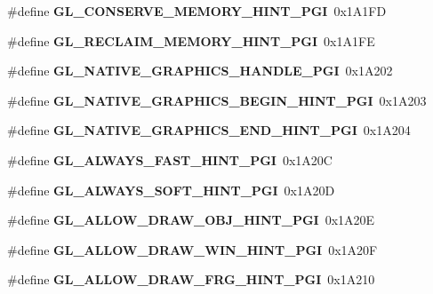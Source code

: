 \begin{DoxyCompactItemize}
\item 
\#define {\bfseries G\+L\+\_\+\+C\+O\+N\+S\+E\+R\+V\+E\+\_\+\+M\+E\+M\+O\+R\+Y\+\_\+\+H\+I\+N\+T\+\_\+\+P\+G\+I}~0x1\+A1\+F\+D\label{_s_d_l__opengl_8h_a41e0ff3de2eb01884561615993b553fa}

\item 
\#define {\bfseries G\+L\+\_\+\+R\+E\+C\+L\+A\+I\+M\+\_\+\+M\+E\+M\+O\+R\+Y\+\_\+\+H\+I\+N\+T\+\_\+\+P\+G\+I}~0x1\+A1\+F\+E\label{_s_d_l__opengl_8h_a379004101af841ae7562fb41897efebf}

\item 
\#define {\bfseries G\+L\+\_\+\+N\+A\+T\+I\+V\+E\+\_\+\+G\+R\+A\+P\+H\+I\+C\+S\+\_\+\+H\+A\+N\+D\+L\+E\+\_\+\+P\+G\+I}~0x1\+A202\label{_s_d_l__opengl_8h_a31b57d82a7ce6619eb00b024c93e3af5}

\item 
\#define {\bfseries G\+L\+\_\+\+N\+A\+T\+I\+V\+E\+\_\+\+G\+R\+A\+P\+H\+I\+C\+S\+\_\+\+B\+E\+G\+I\+N\+\_\+\+H\+I\+N\+T\+\_\+\+P\+G\+I}~0x1\+A203\label{_s_d_l__opengl_8h_ac1f459d4db1b7fe83c0a79c3b25a3a65}

\item 
\#define {\bfseries G\+L\+\_\+\+N\+A\+T\+I\+V\+E\+\_\+\+G\+R\+A\+P\+H\+I\+C\+S\+\_\+\+E\+N\+D\+\_\+\+H\+I\+N\+T\+\_\+\+P\+G\+I}~0x1\+A204\label{_s_d_l__opengl_8h_ab839259f846da85bb7c976082a6b509b}

\item 
\#define {\bfseries G\+L\+\_\+\+A\+L\+W\+A\+Y\+S\+\_\+\+F\+A\+S\+T\+\_\+\+H\+I\+N\+T\+\_\+\+P\+G\+I}~0x1\+A20\+C\label{_s_d_l__opengl_8h_a1c4ab95495a972766d23237f649e6cce}

\item 
\#define {\bfseries G\+L\+\_\+\+A\+L\+W\+A\+Y\+S\+\_\+\+S\+O\+F\+T\+\_\+\+H\+I\+N\+T\+\_\+\+P\+G\+I}~0x1\+A20\+D\label{_s_d_l__opengl_8h_ab6a661b32a607be0e8c9e45726ba969d}

\item 
\#define {\bfseries G\+L\+\_\+\+A\+L\+L\+O\+W\+\_\+\+D\+R\+A\+W\+\_\+\+O\+B\+J\+\_\+\+H\+I\+N\+T\+\_\+\+P\+G\+I}~0x1\+A20\+E\label{_s_d_l__opengl_8h_ae382f61f0c48135a726cac74c7ec8384}

\item 
\#define {\bfseries G\+L\+\_\+\+A\+L\+L\+O\+W\+\_\+\+D\+R\+A\+W\+\_\+\+W\+I\+N\+\_\+\+H\+I\+N\+T\+\_\+\+P\+G\+I}~0x1\+A20\+F\label{_s_d_l__opengl_8h_ab396d389538023b465d21642c506d746}

\item 
\#define {\bfseries G\+L\+\_\+\+A\+L\+L\+O\+W\+\_\+\+D\+R\+A\+W\+\_\+\+F\+R\+G\+\_\+\+H\+I\+N\+T\+\_\+\+P\+G\+I}~0x1\+A210\label{_s_d_l__opengl_8h_a38f7c48f4fb4bf4145999260c4c696b4}


\end{DoxyCompactItemize}
